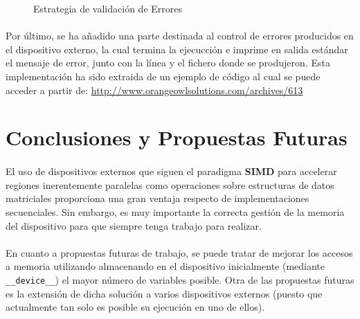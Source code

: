 \documentclass[10pt, a4paper,spanish]{article}
\begin{document}
		\begin{figure}[h]
			\centering
			\inputminted{cuda}{./code/error.cu}
			\caption{Estrategia de validación de Errores}
			\label{code:error}
		\end{figure}

		\paragraph{}
		Por último, se ha añadido una parte destinada al control de errores producidos en el dispositivo externo, la cual termina la ejecucción e imprime en salida estándar el mensaje de error, junto con la línea y el fichero donde se produjeron. Esta implementación ha sido extraida de un ejemplo de código al cual se puede acceder a partir de: \url{http://www.orangeowlsolutions.com/archives/613} \cite{orangeowlsolutions:error}

	\section{Conclusiones y Propuestas Futuras}

		\paragraph{}
		El uso de dispositivos externos que siguen el paradigma \textbf{SIMD} para accelerar regiones inerentemente paralelas como operaciones sobre estructuras de datos matriciales proporciona una gran ventaja respecto de implementaciones secuenciales. Sin embargo, es muy importante la correcta gestión de la memoria del dispositivo para que siempre tenga trabajo para realizar.

		\paragraph{}
		En cuanto a propuestas futuras de trabajo, se puede tratar de mejorar los accesos a memoria utilizando almacenando en el dispositivo inicialmente (mediante \texttt{\_\_device\_\_}) el mayor número de variables posible. Otra de las propuestas futuras es la extensión de dicha solución a varios dispositivos externos (puesto que actualmente tan solo es posible su ejecución en uno de ellos).

	\nocite{subject:cp}
  
  
\end{document}
